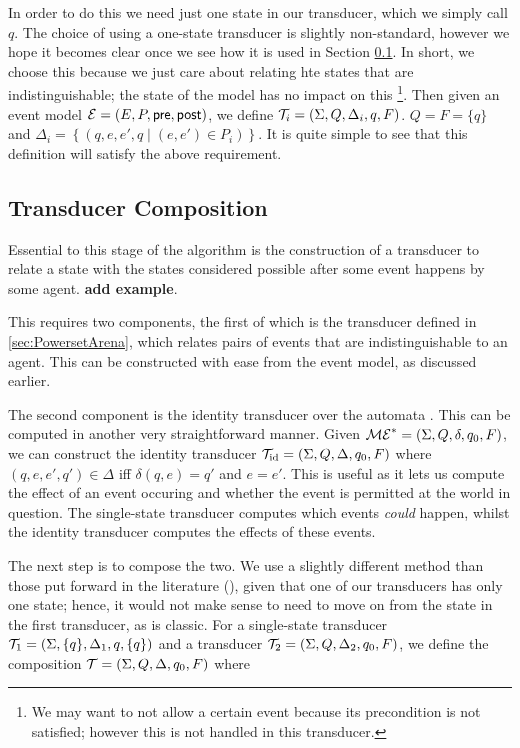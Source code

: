 \documentclass[10pt, a4paper]{report}
\begin{document}
In order to do this we need just one state in our transducer, which we simply
call $q$. The choice of using a one-state transducer is slightly non-standard,
however we hope it becomes clear once we see how it is used in Section
\ref{sec:TransducerComposition}. In short, we choose this because we just care
about relating hte states that are indistinguishable; the state of the model has
no impact on this \footnote{We may want to not allow a certain event because its
  precondition is not satisfied; however this is not handled in this
  transducer.}. Then given an event model $\mathcal{E} = (E, P, \textsf{pre}, \textsf{post})$, we
define $\mathcal{T}_i = (\Sigma, Q, \Delta_i, q, F)$. $Q = F = \{q\}$ and $\Delta_i =
\left\{ (q, e, e', q \mid (e, e') \in P_i) \right\}$. It is quite simple to see
that this definition will satisfy the above requirement.

\subsection{Transducer Composition}
\label{sec:TransducerComposition}

Essential to this stage of the algorithm is the construction of a transducer to
relate a state with the states considered possible after some event happens by
some agent. \textbf{add example}.

This requires two components, the first of which is the transducer defined in
\ref{sec:PowersetArena}, which relates pairs of events that are
indistinguishable to an agent. This can be constructed with ease from the event
model, as discussed earlier.

The second component is the identity transducer over the automata \mestar. This
can be computed in another very straightforward manner. Given $\mathcal{ME}^\ast =
(\Sigma, Q, \delta, q_0, F)$, we can construct the identity transducer
$\mathcal{T}_{\text{id}} = (\Sigma, Q, \Delta, q_0, F)$ where $(q, e, e', q') \in
\Delta$ iff $\delta(q, e) = q'$ and $e = e'$. This is useful as it lets us
compute the effect of an event occuring and whether the event is permitted at
the world in question. The single-state transducer computes which events
\emph{could} happen, whilst the identity transducer computes the effects of
these events. 

The next step is to compose the two. We use a slightly different method than
those put forward in the literature (\cite{ComposingFSTs}), given that one of
our transducers has only one state; hence, it would not make sense to need to
move on from the state in the first transducer, as is classic. For a
single-state transducer $\mathcal{T}_1 = (\Sigma, \{q\}, \Delta_1, q, \{q\})$ and
a transducer $\mathcal{T}_2 = (\Sigma, Q, \Delta_2, q_0, F)$, we define the
composition $\mathcal{T} = (\Sigma, Q, \Delta, q_0, F)$ where 
\end{document}

